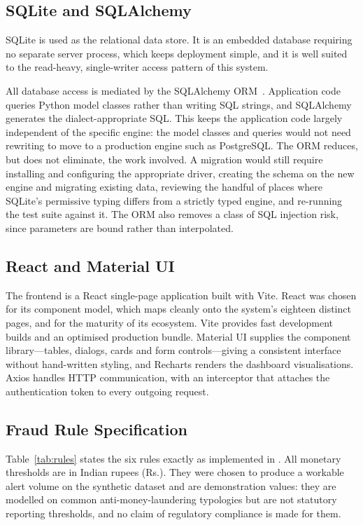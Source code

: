 \subsection{SQLite and SQLAlchemy}
SQLite is used as the relational data store. It is an embedded database requiring no separate server process, which keeps deployment simple, and it is well suited to the read-heavy, single-writer access pattern of this system.

All database access is mediated by the SQLAlchemy ORM~\cite{sqlalchemy}. Application code queries Python model classes rather than writing SQL strings, and SQLAlchemy generates the dialect-appropriate SQL. This keeps the application code largely independent of the specific engine: the model classes and queries would not need rewriting to move to a production engine such as PostgreSQL. The ORM reduces, but does not eliminate, the work involved. A migration would still require installing and configuring the appropriate driver, creating the schema on the new engine and migrating existing data, reviewing the handful of places where SQLite's permissive typing differs from a strictly typed engine, and re-running the test suite against it. The ORM also removes a class of SQL injection risk, since parameters are bound rather than interpolated.

\subsection{React and Material UI}
The frontend is a React single-page application built with Vite. React was chosen for its component model, which maps cleanly onto the system's eighteen distinct pages, and for the maturity of its ecosystem. Vite provides fast development builds and an optimised production bundle. Material UI supplies the component library---tables, dialogs, cards and form controls---giving a consistent interface without hand-written styling, and Recharts renders the dashboard visualisations. Axios handles HTTP communication, with an interceptor that attaches the authentication token to every outgoing request.

\subsection{Fraud Rule Specification}\label{sec:rulespec}
Table~\ref{tab:rules} states the six rules exactly as implemented in . All monetary thresholds are in Indian rupees (Rs.). They were chosen to produce a workable alert volume on the synthetic dataset and are demonstration values: they are modelled on common anti-money-laundering typologies but are not statutory reporting thresholds, and no claim of regulatory compliance is made for them.

